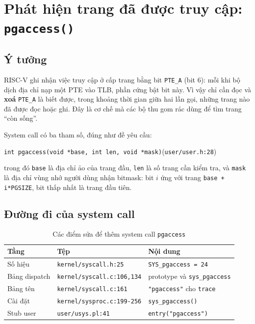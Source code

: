 \chapter{Phát hiện trang đã được truy cập: \texttt{pgaccess()}}

\newpage

\section{Ý tưởng}

RISC-V ghi nhận việc truy cập ở cấp trang bằng bit \texttt{PTE\_A} (bit 6): mỗi khi bộ dịch địa chỉ nạp một PTE vào TLB, phần cứng bật bit này. Vì vậy chỉ cần đọc và \textbf{xoá} \texttt{PTE\_A} là biết được, trong khoảng thời gian giữa hai lần gọi, những trang nào đã được đọc hoặc ghi. Đây là cơ chế mà các bộ thu gom rác dùng để tìm trang ``còn sống''.

System call có ba tham số, đúng như đề yêu cầu:

\begin{center}
\texttt{int pgaccess(void *base, int len, void *mask)}\quad (\texttt{user/user.h:28})
\end{center}

\noindent trong đó \texttt{base} là địa chỉ ảo của trang đầu, \texttt{len} là số trang cần kiểm tra, và \texttt{mask} là địa chỉ vùng nhớ người dùng nhận bitmask: bit $i$ ứng với trang \texttt{base + i*PGSIZE}, bit thấp nhất là trang đầu tiên.

\section{Đường đi của system call}

\begin{table}[H]
    \centering
    \renewcommand{\arraystretch}{1.3}
    \setlength{\tabcolsep}{8pt}
    \begin{tabular}{|l|l|l|}
        \hline
        \rowcolor[rgb]{0.8, 0.9, 1.0}
        \textbf{Tầng} & \textbf{Tệp} & \textbf{Nội dung} \\ \hline
        Số hiệu & \texttt{kernel/syscall.h:25} & \texttt{SYS\_pgaccess = 24} \\ \hline
        Bảng dispatch & \texttt{kernel/syscall.c:106,134} & prototype và \texttt{sys\_pgaccess} \\ \hline
        Bảng tên & \texttt{kernel/syscall.c:161} & \texttt{"pgaccess"} cho \texttt{trace} \\ \hline
        Cài đặt & \texttt{kernel/sysproc.c:199-256} & \texttt{sys\_pgaccess()} \\ \hline
        Stub user & \texttt{user/usys.pl:41} & \texttt{entry("pgaccess")} \\ \hline
    \end{tabular}
    \caption{Các điểm sửa để thêm system call \texttt{pgaccess}}
\end{table}

